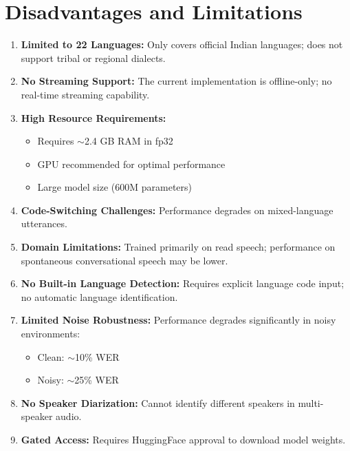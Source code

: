 \documentclass[12pt,a4paper]{article}
\begin{document}
\section{Disadvantages and Limitations}

\begin{enumerate}[leftmargin=*]
\item \textbf{Limited to 22 Languages:} Only covers official Indian languages; does not support tribal or regional dialects.

\item \textbf{No Streaming Support:} The current implementation is offline-only; no real-time streaming capability.

\item \textbf{High Resource Requirements:}
  \begin{itemize}
  \item Requires $\sim$2.4 GB RAM in fp32
  \item GPU recommended for optimal performance
  \item Large model size (600M parameters)
  \end{itemize}

\item \textbf{Code-Switching Challenges:} Performance degrades on mixed-language utterances.

\item \textbf{Domain Limitations:} Trained primarily on read speech; performance on spontaneous conversational speech may be lower.

\item \textbf{No Built-in Language Detection:} Requires explicit language code input; no automatic language identification.

\item \textbf{Limited Noise Robustness:} Performance degrades significantly in noisy environments:
  \begin{itemize}
  \item Clean: $\sim$10\% WER
  \item Noisy: $\sim$25\% WER
  \end{itemize}

\item \textbf{No Speaker Diarization:} Cannot identify different speakers in multi-speaker audio.

\item \textbf{Gated Access:} Requires HuggingFace approval to download model weights.
\end{enumerate}
\end{document}
